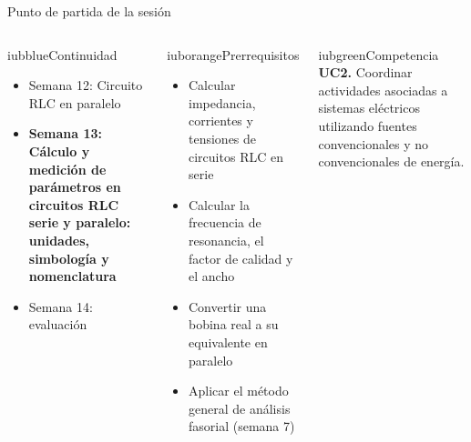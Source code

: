 \documentclass[aspectratio=169,11pt,xcolor={table}]{beamer}
\begin{document}
\begin{frame}{Punto de partida de la sesión}
\begin{columns}[T,onlytextwidth]
\begin{caja}[height=5.9cm]{iubblue}{Continuidad}
\scriptsize \begin{itemize}\setlength{\itemsep}{2pt}
  \item Semana 12: Circuito RLC en paralelo
  \item \textbf{Semana 13: Cálculo y medición de parámetros en circuitos RLC serie y paralelo: unidades, simbología y nomenclatura}
  \item Semana 14: evaluación
\end{itemize}
\end{caja}
\begin{caja}[height=5.9cm]{iuborange}{Prerrequisitos}
\scriptsize \begin{itemize}\setlength{\itemsep}{2pt}
  \item Calcular impedancia, corrientes y tensiones de circuitos RLC en serie
  \item Calcular la frecuencia de resonancia, el factor de calidad y el ancho
  \item Convertir una bobina real a su equivalente en paralelo
  \item Aplicar el método general de análisis fasorial (semana 7)
\end{itemize}
\end{caja}
\begin{caja}[height=5.9cm]{iubgreen}{Competencia}
\scriptsize \textbf{UC2.} Coordinar actividades asociadas a sistemas eléctricos utilizando fuentes convencionales y no convencionales de energía.
\end{caja}
\end{columns}
\end{frame}
\end{document}
